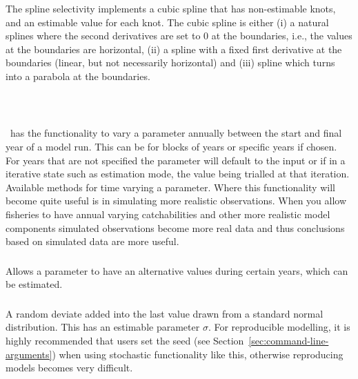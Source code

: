 \subsubsection[Spline]{}

The spline selectivity implements a cubic spline that has non-estimable knots, and an estimable value for each knot. The cubic spline is either (i) a natural splines where the second derivatives are set to 0 at the boundaries, i.e., the values at the boundaries are horizontal, (ii) a spline with a fixed first derivative at the boundaries (linear, but not necessarily horizontal) and (iii) spline which turns into a parabola at the boundaries.

\


\subsection{\label{sec:time_var}}

\CNAME\ has the functionality to vary a parameter annually between the start and final year of a model run. This can be for blocks of years or specific years if chosen. For years that are not specified the parameter will default to the input or if in a iterative state such as estimation mode, the value being trialled at that iteration. Available methods for time varying a parameter. Where this functionality will become quite useful is in simulating more realistic observations. When you allow fisheries to have annual varying catchabilities and other more realistic model components simulated observations become more real data and thus conclusions based on simulated data are more useful.

\subsubsection[Constant]{}
Allows a parameter to have an alternative values during certain years, which can be estimated.

\subsubsection[Random Walk]{}
A random deviate added into the last value drawn from a standard normal distribution. This has an estimable parameter $\sigma$. For reproducible modelling, it is highly recommended that users set the seed (see Section~\ref{sec:command-line-arguments}) when using stochastic functionality like this, otherwise reproducing models becomes very difficult.

